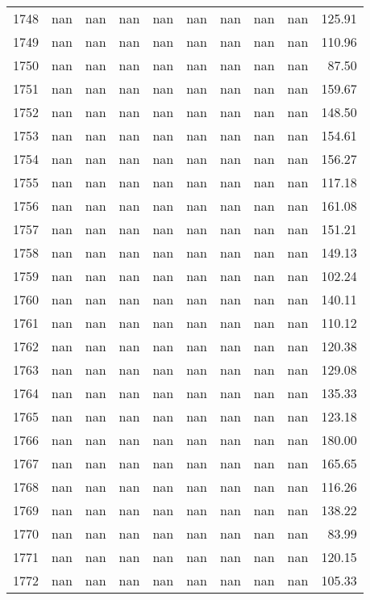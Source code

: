 \begin{tabular}{lrrrrrrrrr}
1748 & nan & nan & nan & nan & nan & nan & nan & nan & 125.91 \\
1749 & nan & nan & nan & nan & nan & nan & nan & nan & 110.96 \\
1750 & nan & nan & nan & nan & nan & nan & nan & nan & 87.50 \\
1751 & nan & nan & nan & nan & nan & nan & nan & nan & 159.67 \\
1752 & nan & nan & nan & nan & nan & nan & nan & nan & 148.50 \\
1753 & nan & nan & nan & nan & nan & nan & nan & nan & 154.61 \\
1754 & nan & nan & nan & nan & nan & nan & nan & nan & 156.27 \\
1755 & nan & nan & nan & nan & nan & nan & nan & nan & 117.18 \\
1756 & nan & nan & nan & nan & nan & nan & nan & nan & 161.08 \\
1757 & nan & nan & nan & nan & nan & nan & nan & nan & 151.21 \\
1758 & nan & nan & nan & nan & nan & nan & nan & nan & 149.13 \\
1759 & nan & nan & nan & nan & nan & nan & nan & nan & 102.24 \\
1760 & nan & nan & nan & nan & nan & nan & nan & nan & 140.11 \\
1761 & nan & nan & nan & nan & nan & nan & nan & nan & 110.12 \\
1762 & nan & nan & nan & nan & nan & nan & nan & nan & 120.38 \\
1763 & nan & nan & nan & nan & nan & nan & nan & nan & 129.08 \\
1764 & nan & nan & nan & nan & nan & nan & nan & nan & 135.33 \\
1765 & nan & nan & nan & nan & nan & nan & nan & nan & 123.18 \\
1766 & nan & nan & nan & nan & nan & nan & nan & nan & 180.00 \\
1767 & nan & nan & nan & nan & nan & nan & nan & nan & 165.65 \\
1768 & nan & nan & nan & nan & nan & nan & nan & nan & 116.26 \\
1769 & nan & nan & nan & nan & nan & nan & nan & nan & 138.22 \\
1770 & nan & nan & nan & nan & nan & nan & nan & nan & 83.99 \\
1771 & nan & nan & nan & nan & nan & nan & nan & nan & 120.15 \\
1772 & nan & nan & nan & nan & nan & nan & nan & nan & 105.33 \\

\end{tabular}
